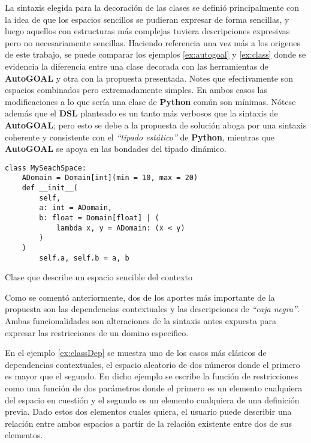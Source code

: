 La sintaxis elegida para la decoración de las clases se definió principalmente con la idea de
que los espacios sencillos se pudieran expresar de forma sencillas, y luego aquellos con estructuras más
complejas tuviera descripciones expresivas pero no necesariamente sencillas.
\newpage
Haciendo referencia una vez
más a los origenes de este trabajo, se puede comparar los ejemplos \ref{ex:autogoal} y \ref{ex:class} donde se
evidencia la diferencia entre una clase decorada con las herramientas de {\bf AutoGOAL} y otra con la propuesta
presentada. Notes que efectivamente son espacios combinados pero extremadamente simples. En ambos casos las
modificaciones a lo que sería una clase de {\bf Python} común son mínimas. Nótese además que el {\bf DSL}
planteado es un tanto más verbosos que la sintaxis de {\bf AutoGOAL}; pero esto se debe a la propuesta de solución
aboga por una sintaxis coherente y consistente con el {\it “tipado estático”} de {\bf Python}, mientras que
    {\bf AutoGOAL} se apoya en las bondades del tipado dinámico.



\begin{listing}[!ht]
    \begin{verbatim}
class MySeachSpace:
    ADomain = Domain[int](min = 10, max = 20)
    def __init__(
        self, 
        a: int = ADomain,
        b: float = Domain[float] | (
            lambda x, y = ADomain: (x < y)
        )
    )
        self.a, self.b = a, b

    \end{verbatim}
    \caption{Clase que describe un espacio sencible del contexto}
    \label{ex:classDep}
\end{listing}

Como se comentó anteriormente, dos de los aportes más importante de la propuesta son las dependencias
contextuales y las descripciones de {\it “caja negra”}. Ambas funcionalidades son alteraciones de la sintaxis
antes expuesta para expresar las restricciones de un domino especifico.

En el ejemplo \ref{ex:classDep} se muestra
uno de los casos más clásicos de dependencias contextuales, el espacio aleatorio de dos números donde el
primero es mayor que el segundo. En dicho ejemplo se escribe la función de restricciones como una función
de dos parámetros donde el primero es un elemento cualquiera del espacio en cuestión y el segundo es un
elemento cualquiera de una definición previa. Dado estos dos elementos cuales quiera, el usuario puede
describir una relación entre ambos espacios a partir de la relación existente entre dos de sus elementos.

